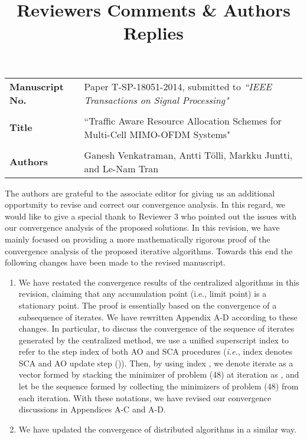 \documentclass[10pt,letterpaper,onecolumn]{article}
\begin{document}
\title{Reviewers Comments \& Authors Replies}

\date{}
\maketitle

\begin{tabular}{p{1.25in}p{4.25in}}
	\textbf{Manuscript No.} & Paper T-SP-18051-2014, submitted to \emph{``IEEE Transactions on Signal Processing"} \\ \\
	\textbf{Title} & ``Traffic Aware Resource Allocation Schemes for Multi-Cell MIMO-OFDM Systems" \\ \\
	\textbf{Authors} & Ganesh Venkatraman, Antti T\"{o}lli, Markku Juntti, and Le-Nam Tran
\end{tabular}

\vspace{0.35in}
The authors are grateful to the associate editor for giving us an additional opportunity to revise and correct our convergence analysis. In this regard, we would like to give a special thank to Reviewer 3 who pointed out the issues with our convergence analysis of the proposed solutions. In this revision, we have mainly focused on providing a more mathematically rigorous  proof of the convergence analysis of the proposed iterative algorithms.
%
Towards this end the following changes have been made to the revised manuscript.
\begin{enumerate}
	\item We have restated the convergence results of the centralized algorithms in this revision, claiming that any accumulation point (i.e., limit point) is a stationary point. The proof is essentially based on the convergence of a subsequence of iterates. We have rewritten Appendix A-D according to these changes. In particular, to discuss the convergence of the sequence of iterates generated by the centralized method, we use a unified superscript index  to refer to the step index of both \ac{AO} and \ac{SCA} procedures (\textit{i.e.}, index  denotes \ac{SCA} and \ac{AO} update step ()). Then, by using index , we denote iterate  as a vector formed by stacking the minimizer of problem (48) at iteration  as , and let  be the sequence formed by collecting the minimizers of problem (48) from each iteration. With these notations, we have revised our convergence discussions in Appendices A-C and A-D.		
	\item We have updated the convergence of distributed algorithms in a similar way.
\end{enumerate}
\end{document}
